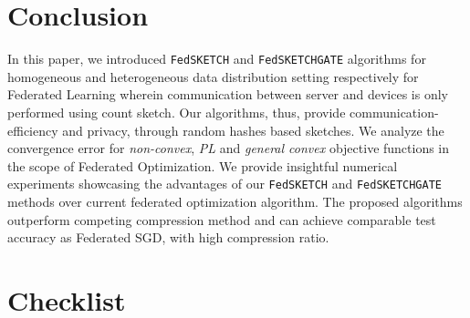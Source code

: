 \documentclass[11pt]{article}
\begin{document}
\vspace{-0.1in}
\section{Conclusion}
\vspace{-0.05in}

In this paper, we introduced \texttt{FedSKETCH} and \texttt{FedSKETCHGATE} algorithms for homogeneous and heterogeneous data distribution setting respectively for Federated Learning wherein communication between server and devices is only performed using count sketch. 
Our algorithms, thus, provide communication-efficiency and privacy, through random hashes based sketches. 
We analyze the convergence error for \emph{non-convex}, \emph{PL} and \emph{general convex} objective functions in the scope of Federated Optimization.  
We provide insightful numerical experiments showcasing the advantages of our \texttt{FedSKETCH} and \texttt{FedSKETCHGATE} methods over current federated optimization algorithm. The proposed algorithms outperform competing compression method and can achieve comparable test accuracy as Federated SGD, with high compression ratio.






\clearpage


\clearpage

\section*{Checklist}
\end{document}
